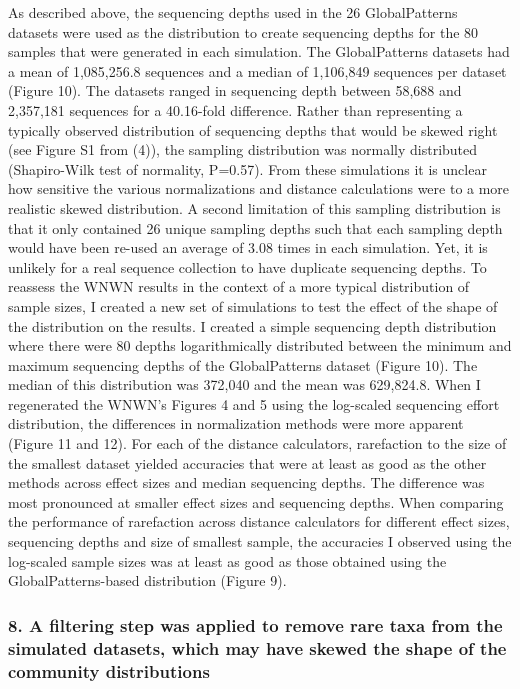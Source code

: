 \documentclass[
]{article}
\begin{document}
As described above, the sequencing depths used in the 26 GlobalPatterns
datasets were used as the distribution to create sequencing depths for
the 80 samples that were generated in each simulation. The
GlobalPatterns datasets had a mean of 1,085,256.8 sequences and a median
of 1,106,849 sequences per dataset (Figure 10). The datasets ranged in
sequencing depth between 58,688 and 2,357,181 sequences for a 40.16-fold
difference. Rather than representing a typically observed distribution
of sequencing depths that would be skewed right (see Figure S1 from
(4)), the sampling distribution was normally distributed (Shapiro-Wilk
test of normality, P=0.57). From these simulations it is unclear how
sensitive the various normalizations and distance calculations were to a
more realistic skewed distribution. A second limitation of this sampling
distribution is that it only contained 26 unique sampling depths such
that each sampling depth would have been re-used an average of 3.08
times in each simulation. Yet, it is unlikely for a real sequence
collection to have duplicate sequencing depths. To reassess the WNWN
results in the context of a more typical distribution of sample sizes, I
created a new set of simulations to test the effect of the shape of the
distribution on the results. I created a simple sequencing depth
distribution where there were 80 depths logarithmically distributed
between the minimum and maximum sequencing depths of the GlobalPatterns
dataset (Figure 10). The median of this distribution was 372,040 and the
mean was 629,824.8. When I regenerated the WNWN's Figures 4 and 5 using
the log-scaled sequencing effort distribution, the differences in
normalization methods were more apparent (Figure 11 and 12). For each of
the distance calculators, rarefaction to the size of the smallest
dataset yielded accuracies that were at least as good as the other
methods across effect sizes and median sequencing depths. The difference
was most pronounced at smaller effect sizes and sequencing depths. When
comparing the performance of rarefaction across distance calculators for
different effect sizes, sequencing depths and size of smallest sample,
the accuracies I observed using the log-scaled sample sizes was at least
as good as those obtained using the GlobalPatterns-based distribution
(Figure 9).

\hypertarget{a-filtering-step-was-applied-to-remove-rare-taxa-from-the-simulated-datasets-which-may-have-skewed-the-shape-of-the-community-distributions}{%
\subsubsection{8. A filtering step was applied to remove rare taxa from
the simulated datasets, which may have skewed the shape of the community
distributions}\label{a-filtering-step-was-applied-to-remove-rare-taxa-from-the-simulated-datasets-which-may-have-skewed-the-shape-of-the-community-distributions}}
\end{document}
